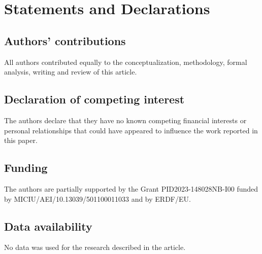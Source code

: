 \documentclass[a4paper,10pt, reqno]{amsart}
\theoremstyle{definition}
\theoremstyle{remark}
\numberwithin{equation}{section}
\begin{document}
\section*{Statements and Declarations}

\subsection*{Authors' contributions} All authors contributed equally to the conceptualization, methodology, formal analysis, writing and review of this article.

\subsection*{Declaration of competing interest} The authors declare that they have no known competing financial interests or personal relationships that could have appeared to influence the work reported in this paper.

\subsection*{Funding} The authors are partially supported by the Grant PID2023-148028NB-I00 funded by MICIU/AEI/10.13039/501100011033 and by ERDF/EU.

\subsection*{Data availability} No data was used for the research described in the article.


\end{document}
